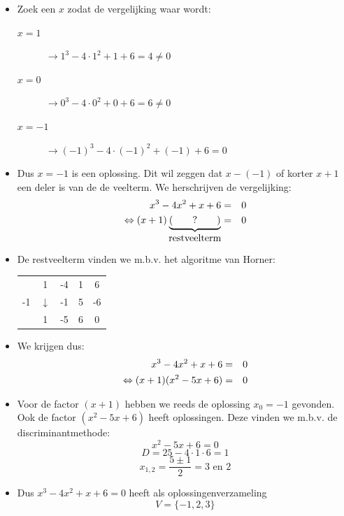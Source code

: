 \documentclass[12pt]{article}
\begin{document}
\begin{itemize}
\item Zoek een $x$ zodat de vergelijking waar wordt:
  \begin{description}
  \item[$x=1$] $\rightarrow 1^3-4\cdot 1^2+1+6 = 4 \neq 0$
  \item[$x=0$] $\rightarrow 0^3-4\cdot 0^2+0+6 = 6 \neq 0$
  \item[$x=-1$] $\rightarrow (-1)^3-4\cdot (-1)^2+(-1)+6 = 0$
  \end{description}
\item Dus $x=-1$ is een oplossing. Dit wil zeggen dat $x-(-1)$ of korter $x+1$ een deler is van de de veelterm. We herschrijven de vergelijking:
  \begin{eqnarray*}
    x^3-4x^2+x+6&=&0\\
    \Leftrightarrow (x+1)\underbrace{(\qquad ? \qquad)}_{\mbox{restveelterm}}&=&0\\
  \end{eqnarray*}
\item De restveelterm vinden we m.b.v. het algoritme van Horner:
  \begin{center}
    \begin{tabular}{c|cccc}
      & 1 & -4 & 1 & 6\\
      -1 & $\downarrow$ & -1 & 5 & -6\\
      \hline
      & 1 & -5 & 6 & 0
    \end{tabular}
  \end{center}
\item We krijgen dus:
  \begin{eqnarray*}
    x^3-4x^2+x+6&=&0\\
    \Leftrightarrow (x+1)(x^2-5x+6)&=&0\\
  \end{eqnarray*}
\item Voor de factor $(x+1)$ hebben we reeds de oplossing $x_0=-1$ gevonden. Ook de factor $(x^2-5x+6)$ heeft oplossingen. Deze vinden we m.b.v. de discriminantmethode:
  $$x^2-5x+6=0$$
  $$D=25-4\cdot 1\cdot 6=1$$
  $$x_{1,2}=\dfrac{5\pm 1}{2}=3\mbox{ en }2$$
\item Dus $x^3-4x^2+x+6=0$ heeft als oplossingenverzameling
  $$V=\{-1, 2, 3\}$$
\end{itemize}
\end{document}
